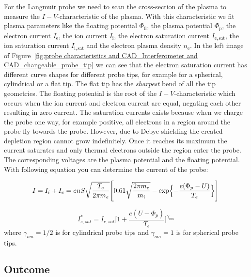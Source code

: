 For the Langmuir probe we need to scan the cross-section of the plasma to measure the $I-V$-characteristic of the plasma. With this characteristic we fit plasma  parameters like the floating potential $\Phi_\mathrm{fl}$, the plasma potential $\Phi_\mathrm{p}$, the electron current $I_\mathrm{e}$, the ion current $I_\mathrm{i}$, the electron saturation current $I_\mathrm{e,sat}$, the ion saturation current $I_\mathrm{i,sat}$ and the electron plasma density $n_\mathrm{e}$.
In the left image of Figure~\ref{fig:probe characteristics and CAD_Interferometer and CAD_changeable_probe_tip} we can see that the electron saturation current has different curve shapes for different probe tips, for example for a spherical, cylindrical or a flat tip. The flat tip has the \emph{sharpest} bend of all the tip geometries.
The floating potential is the root of the $I-V$-characteristic which occurs when the ion current and electron current are equal, negating each other resulting in zero current.
The saturation currents exists because when we charge the probe one way, for example positive, all electrons in a region around the probe fly towards the probe. However, due to Debye shielding the created depletion region cannot grow indefinitely. Once it reaches its maximum the current saturates and only thermal electrons outside the region enter the probe. The corresponding voltages are the plasma potential and the floating potential. With following equation you can determine the current of the probe:

\begin{equation}
    I=I_i+I_e=enS \sqrt{\frac{T_e}{2 \pi m_e}}
    \Biggr[0.61 \sqrt{\frac{2 \pi m_e}{m_i}}-\exp\Bigl\{-\frac{e(\Phi_p -U)}{T_e}\Bigr\}
        \Biggl]
\end{equation}


\begin{equation}
    I^*_{e,sat} =I_{e,sat}\Biggr[1+ \frac{e(U-\Phi_p)}{T_e}\Biggl]^{\gamma_{om}}
\end{equation}
where $\gamma_{om}= 1/2$ is for cylindrical probe tips and $\gamma_{om}= 1$ is for spherical probe tips.\cite{Stroth_Plasmaphysik}



\subsection{Outcome}

